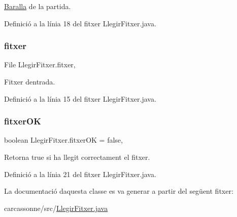 \mbox{\hyperlink{class_baralla}{Baralla}} de la partida. 



Definició a la línia 18 del fitxer Llegir\+Fitxer.\+java.

\mbox{\label{class_llegir_fitxer_a81ceab1221bd739556c180354469e191}} 
\subsubsection{\texorpdfstring{fitxer}{fitxer}}
{\footnotesize\ttfamily File Llegir\+Fitxer.\+fitxer\hspace{0.3cm}{\ttfamily [static]}, {\ttfamily [private]}}



Fitxer d\textquotesingle{}entrada. 



Definició a la línia 15 del fitxer Llegir\+Fitxer.\+java.

\mbox{\label{class_llegir_fitxer_a5f1f80e4456840164411de8a5756c716}} 
\subsubsection{\texorpdfstring{fitxer\+OK}{fitxerOK}}
{\footnotesize\ttfamily boolean Llegir\+Fitxer.\+fitxer\+OK = false\hspace{0.3cm}{\ttfamily [static]}, {\ttfamily [private]}}



Retorna true si ha llegit correctament el fitxer. 



Definició a la línia 21 del fitxer Llegir\+Fitxer.\+java.



La documentació d\textquotesingle{}aquesta classe es va generar a partir del següent fitxer\+:\begin{DoxyCompactItemize}
\item 
carcassonne/src/\mbox{\hyperlink{_llegir_fitxer_8java}{Llegir\+Fitxer.\+java}}\end{DoxyCompactItemize}
